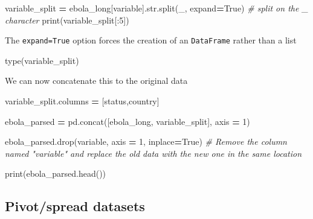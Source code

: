 \documentclass[
  letterpaper,
]{scrbook}
\newenvironment{Shaded}{\begin{snugshade}}{\end{snugshade}}
\newcommand{\BuiltInTok}[1]{#1}
\newcommand{\CommentTok}[1]{\textcolor[rgb]{0.56,0.35,0.01}{\textit{#1}}}
\newcommand{\DecValTok}[1]{\textcolor[rgb]{0.00,0.00,0.81}{#1}}
\newcommand{\NormalTok}[1]{#1}
\newcommand{\OperatorTok}[1]{\textcolor[rgb]{0.81,0.36,0.00}{\textbf{#1}}}
\newcommand{\StringTok}[1]{\textcolor[rgb]{0.31,0.60,0.02}{#1}}
\newcommand{\VariableTok}[1]{\textcolor[rgb]{0.00,0.00,0.00}{#1}}
\begin{document}
\begin{Shaded}
\begin{Highlighting}[]
\NormalTok{variable\_split }\OperatorTok{=}\NormalTok{ ebola\_long[}\StringTok{\textquotesingle{}variable\textquotesingle{}}\NormalTok{].}\BuiltInTok{str}\NormalTok{.split(}\StringTok{\textquotesingle{}\_\textquotesingle{}}\NormalTok{, expand}\OperatorTok{=}\VariableTok{True}\NormalTok{) }\CommentTok{\# split on the \textasciigrave{}\_\textasciigrave{} character}
\BuiltInTok{print}\NormalTok{(variable\_split[:}\DecValTok{5}\NormalTok{])}
\end{Highlighting}
\end{Shaded}

The \texttt{expand=True} option forces the creation of an \texttt{DataFrame} rather than a list

\begin{Shaded}
\begin{Highlighting}[]
\BuiltInTok{type}\NormalTok{(variable\_split)}
\end{Highlighting}
\end{Shaded}

We can now concatenate this to the original data

\begin{Shaded}
\begin{Highlighting}[]
\NormalTok{variable\_split.columns }\OperatorTok{=}\NormalTok{ [}\StringTok{\textquotesingle{}status\textquotesingle{}}\NormalTok{,}\StringTok{\textquotesingle{}country\textquotesingle{}}\NormalTok{]}

\NormalTok{ebola\_parsed }\OperatorTok{=}\NormalTok{ pd.concat([ebola\_long, variable\_split], axis }\OperatorTok{=} \DecValTok{1}\NormalTok{)}

\NormalTok{ebola\_parsed.drop(}\StringTok{\textquotesingle{}variable\textquotesingle{}}\NormalTok{, axis }\OperatorTok{=} \DecValTok{1}\NormalTok{, inplace}\OperatorTok{=}\VariableTok{True}\NormalTok{) }\CommentTok{\# Remove the column named "variable" and replace the old data with the new one in the same location}

\BuiltInTok{print}\NormalTok{(ebola\_parsed.head())}
\end{Highlighting}
\end{Shaded}

\hypertarget{pivotspread-datasets}{%
\subsection{Pivot/spread datasets}\label{pivotspread-datasets}}
\end{document}
